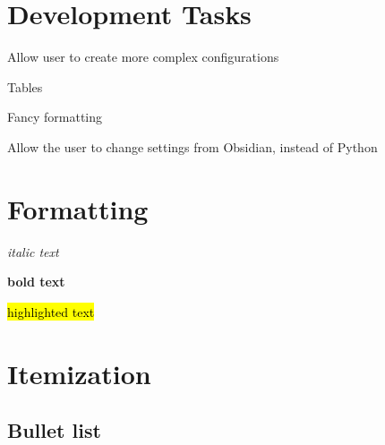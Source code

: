 \documentclass{extarticle}
\begin{document}







\section{Development Tasks}


\begin{todolist}

\item Allow user to create more complex configurations

\item Tables

\begin{todolist}

\item Fancy formatting

\end{todolist}

\item Allow the user to change settings from Obsidian, instead of Python

\end{todolist}






\section{Formatting}




\textit{italic text}



\textbf{bold text}



\hl{highlighted text}








\section{Itemization}

\subsection{Bullet list}
\end{document}
